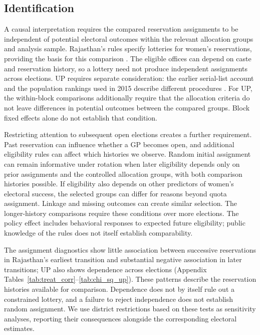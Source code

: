 \documentclass[11pt]{article}
\begin{document}
\subsection{Identification}\label{sec:identification}

A causal interpretation requires the compared reservation assignments to be independent of potential electoral outcomes within the relevant allocation groups and analysis sample. Rajasthan's rules specify lotteries for women's reservations, providing the basis for this comparison \citep[Rule 9(3)]{rajasthan1994electionrules}. The eligible offices can depend on caste and reservation history, so a lottery need not produce independent assignments across elections. UP requires separate consideration: the earlier serial-list account and the population rankings used in 2015 describe different procedures \citep{bose2018political, chaturvedi2025quotas}. For UP, the within-block comparisons additionally require that the allocation criteria do not leave differences in potential outcomes between the compared groups. Block fixed effects alone do not establish that condition.

Restricting attention to subsequent open elections creates a further requirement. Past reservation can influence whether a GP becomes open, and additional eligibility rules can affect which histories we observe. Random initial assignment can remain informative under rotation when later eligibility depends only on prior assignments and the controlled allocation groups, with both comparison histories possible. If eligibility also depends on other predictors of women's electoral success, the selected groups can differ for reasons beyond quota assignment. Linkage and missing outcomes can create similar selection. The longer-history comparisons require these conditions over more elections. The policy effect includes behavioral responses to expected future eligibility; public knowledge of the rules does not itself establish comparability.

The assignment diagnostics show little association between successive reservations in Rajasthan's earliest transition and substantial negative association in later transitions; UP also shows dependence across elections (Appendix Tables~\ref{tab:treat_corr}--\ref{tab:chi_sq_up}). These patterns describe the reservation histories available for comparison. Dependence does not by itself rule out a constrained lottery, and a failure to reject independence does not establish random assignment. We use district restrictions based on these tests as sensitivity analyses, reporting their consequences alongside the corresponding electoral estimates.
\end{document}
